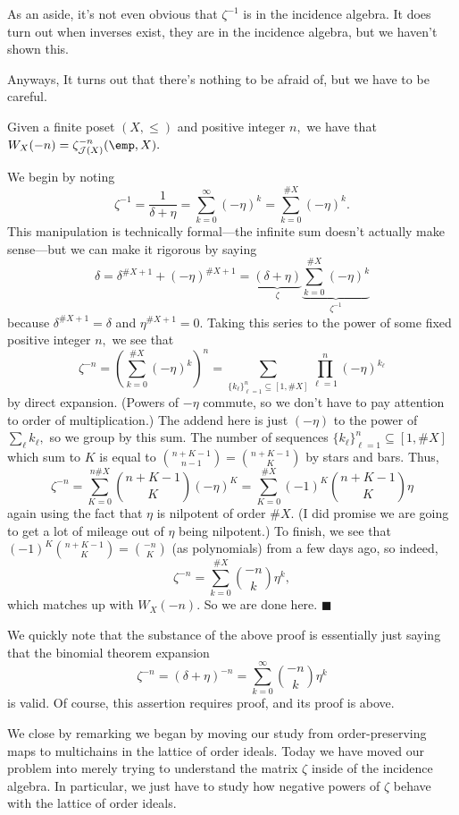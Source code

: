 As an aside, it's not even obvious that $\zeta^{-1}$ is in the incidence algebra. It does turn out when inverses exist, they are in the incidence algebra, but we haven't shown this.

Anyways, It turns out that there's nothing to be afraid of, but we have to be careful.
\begin{proposition}
    Given a finite poset $(X,\le)$ and positive integer $n,$ we have that $W_X(-n)=\zeta_{\mathcal J(X)}^{-n}(\emp,X).$
\end{proposition}
We begin by noting
\[\zeta^{-1}=\frac1{\delta+\eta}=\sum_{k=0}^\infty(-\eta)^k=\sum_{k=0}^{\#X}(-\eta)^k.\]
This manipulation is technically formal---the infinite sum doesn't actually make sense---but we can make it rigorous by saying
\[\delta=\delta^{\#X+1}+(-\eta)^{\#X+1}=\underbrace{(\delta+\eta)}_{\zeta}\underbrace{\sum_{k=0}^{\#X}(-\eta)^k}_{\zeta^{-1}}\]
because $\delta^{\#X+1}=\delta$ and $\eta^{\#X+1}=0.$ Taking this series to the power of some fixed positive integer $n,$ we see that
\[\zeta^{-n}=\left(\sum_{k=0}^{\#X}(-\eta)^k\right)^n=\sum_{\{k_\ell\}_{\ell=1}^n\subseteq[1,\#X]}\prod_{\ell=1}^n(-\eta)^{k_\ell}\]
by direct expansion. (Powers of $-\eta$ commute, so we don't have to pay attention to order of multiplication.) The addend here is just $(-\eta)$ to the power of $\sum_\ell k_\ell,$ so we group by this sum. The number of sequences $\{k_\ell\}_{\ell=1}^n\subseteq[1,\#X]$ which sum to $K$ is equal to $\binom{n+K-1}{n-1}=\binom{n+K-1}K$ by stars and bars. Thus,
\[\zeta^{-n}=\sum_{K=0}^{n\#X}\binom{n+K-1}K(-\eta)^K=\sum_{K=0}^{\#X}(-1)^K\binom{n+K-1}K\eta\]
again using the fact that $\eta$ is nilpotent of order $\#X.$ (I did promise we are going to get a lot of mileage out of $\eta$ being nilpotent.) To finish, we see that $(-1)^K\binom{n+K-1}K=\binom{-n}K$ (as polynomials) from a few days ago, so indeed,
\[\zeta^{-n}=\sum_{k=0}^{\#X}\binom{-n}k\eta^k,\]
which matches up with $W_X(-n).$ So we are done here. $\blacksquare$

We quickly note that the substance of the above proof is essentially just saying that the binomial theorem expansion
\[\zeta^{-n}=(\delta+\eta)^{-n}=\sum_{k=0}^\infty\binom{-n}k\eta^k\]
is valid. Of course, this assertion requires proof, and its proof is above.

We close by remarking we began by moving our study from order-preserving maps to multichains in the lattice of order ideals. Today we have moved our problem into merely trying to understand the matrix $\zeta$ inside of the incidence algebra. In particular, we just have to study how negative powers of $\zeta$ behave with the lattice of order ideals.

